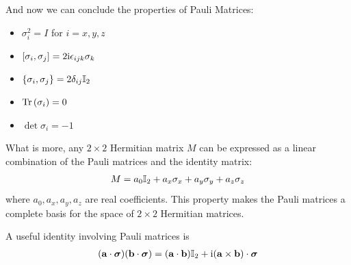 And now we can conclude the properties of Pauli Matrices: 
\begin{itemize}
    \item $\sigma_i^2 = I$ for $i=x,y,z$
    \item $\left[ \sigma_i , \sigma_j \right] = 2 \mathrm{i} \epsilon_{ijk} \sigma_k$
    \item $\left\{ \sigma_i , \sigma_j \right\} = 2 \delta_{ij} \mathbb{I}_2$
    \item $\mathrm{Tr}\left( \sigma_i \right) = 0$
    \item $\det{\sigma_i} = -1$
\end{itemize}

What is more, any $2 \times 2$ Hermitian matrix $M$ can be expressed as a linear combination of the Pauli matrices and the identity matrix:
\begin{align}
    M = a_0 \mathbb{I}_2 + a_x \sigma_x + a_y \sigma_y + a_z \sigma_z
\end{align}
where $a_0, a_x, a_y, a_z$ are real coefficients. This property makes the Pauli matrices a complete basis for the space of $2 \times 2$ Hermitian matrices.

A useful identity involving Pauli matrices is
\begin{align}
    (\mathbf{a} \cdot \boldsymbol{\sigma})(\mathbf{b} \cdot \boldsymbol{\sigma}) = (\mathbf{a} \cdot \mathbf{b}) \mathbb{I}_2 + \mathrm{i} (\mathbf{a} \times \mathbf{b}) \cdot \boldsymbol{\sigma}
\end{align}

